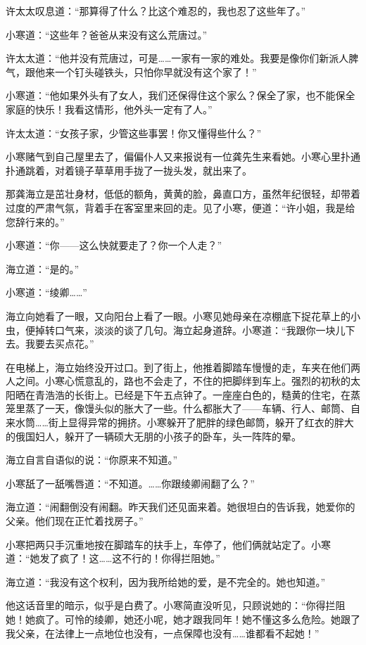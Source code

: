 \par 许太太叹息道：“那算得了什么？比这个难忍的，我也忍了这些年了。”
\par 小寒道：“这些年？爸爸从来没有这么荒唐过。”
\par 许太太道：“他并没有荒唐过，可是……一家有一家的难处。我要是像你们新派人脾气，跟他来一个钉头碰铁头，只怕你早就没有这个家了！”
\par 小寒道：“他如果外头有了女人，我们还保得住这个家么？保全了家，也不能保全家庭的快乐！我看这情形，他外头一定有了人。”
\par 许太太道：“女孩子家，少管这些事罢！你又懂得些什么？”
\par 小寒赌气到自己屋里去了，偏偏仆人又来报说有一位龚先生来看她。小寒心里扑通扑通跳着，对着镜子草草用手拢了一拢头发，就出来了。
\par 那龚海立是茁壮身材，低低的额角，黄黄的脸，鼻直口方，虽然年纪很轻，却带着过度的严肃气氛，背着手在客室里来回的走。见了小寒，便道：“许小姐，我是给您辞行来的。”
\par 小寒道：“你——这么快就要走了？你一个人走？”
\par 海立道：“是的。”
\par 小寒道：“绫卿……”
\par 海立向她看了一眼，又向阳台上看了一眼。小寒见她母亲在凉棚底下捉花草上的小虫，便掉转口气来，淡淡的谈了几句。海立起身道辞。小寒道：“我跟你一块儿下去。我要去买点花。”
\par 在电梯上，海立始终没开过口。到了街上，他推着脚踏车慢慢的走，车夹在他们两人之间。小寒心慌意乱的，路也不会走了，不住的把脚绊到车上。强烈的初秋的太阳晒在青浩浩的长街上。已经是下午五点钟了。一座座白色的，糙黄的住宅，在蒸笼里蒸了一天，像馒头似的胀大了一些。什么都胀大了——车辆、行人、邮筒、自来水筒……街上显得异常的拥挤。小寒躲开了肥胖的绿色邮筒，躲开了红衣的胖大的俄国妇人，躲开了一辆硕大无朋的小孩子的卧车，头一阵阵的晕。
\par 海立自言自语似的说：“你原来不知道。”
\par 小寒舐了一舐嘴唇道：“不知道。……你跟绫卿闹翻了么？”
\par 海立道：“闹翻倒没有闹翻。昨天我们还见面来着。她很坦白的告诉我，她爱你的父亲。他们现在正忙着找房子。”
\par 小寒把两只手沉重地按在脚踏车的扶手上，车停了，他们俩就站定了。小寒道：“她发了疯了！这……这不行的！你得拦阻她。”
\par 海立道：“我没有这个权利，因为我所给她的爱，是不完全的。她也知道。”
\par 他这话音里的暗示，似乎是白费了。小寒简直没听见，只顾说她的：“你得拦阻她！她疯了。可怜的绫卿，她还小呢，她才跟我同年！她不懂这多么危险。她跟了我父亲，在法律上一点地位也没有，一点保障也没有……谁都看不起她！”
